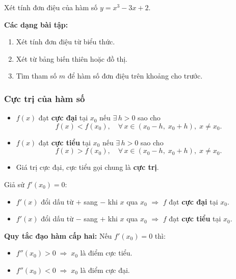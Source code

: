 \documentclass[12pt,a4paper]{article}
\begin{document}
\begin{vidu}
  Xét tính đơn điệu của hàm số $y = x^3 - 3x + 2$.
\end{vidu}

\medskip\noindent\textbf{Các dạng bài tập:}
\begin{enumerate}[label=\textbf{Dạng \arabic*:}, leftmargin=*, align=left]
  \item Xét tính đơn điệu từ biểu thức.
  \item Xét từ bảng biến thiên hoặc đồ thị.
  \item Tìm tham số $m$ để hàm số đơn điệu trên khoảng cho trước.
\end{enumerate}

\subsubsection{Cực trị của hàm số}

\begin{dinhnghia}
  \begin{itemize}
    \item $f(x)$ đạt \textbf{cực đại} tại $x_0$ nếu $\exists\, h > 0$ sao cho
      \[
        f(x) < f(x_0),\quad \forall\, x \in (x_0 - h,\; x_0 + h),\; x \ne x_0.
      \]
    \item $f(x)$ đạt \textbf{cực tiểu} tại $x_0$ nếu $\exists\, h > 0$ sao cho
      \[
        f(x) > f(x_0),\quad \forall\, x \in (x_0 - h,\; x_0 + h),\; x \ne x_0.
      \]
    \item Giá trị cực đại, cực tiểu gọi chung là \textbf{cực trị}.
  \end{itemize}
\end{dinhnghia}

\begin{dinhly}[title={Điều kiện cần và đủ}]
  Giả sử $f'(x_0) = 0$:
  \begin{itemize}
    \item $f'(x)$ đổi dấu từ $+$ sang $-$ khi $x$ qua $x_0$ $\Rightarrow$ $f$ đạt \textbf{cực đại} tại $x_0$.
    \item $f'(x)$ đổi dấu từ $-$ sang $+$ khi $x$ qua $x_0$ $\Rightarrow$ $f$ đạt \textbf{cực tiểu} tại $x_0$.
  \end{itemize}
  \textbf{Quy tắc đạo hàm cấp hai:} Nếu $f'(x_0) = 0$ thì:
  \begin{itemize}
    \item $f''(x_0) > 0 \;\Rightarrow\; x_0$ là điểm cực tiểu.
    \item $f''(x_0) < 0 \;\Rightarrow\; x_0$ là điểm cực đại.
  \end{itemize}
\end{dinhly}
\end{document}

